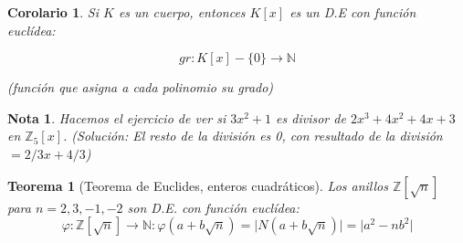 \documentclass[11pt, a4paper, titlepage]{article}
\providecommand{\ent}{\mathbb{Z}}
\providecommand{\nat}{\mathbb{N}}
\providecommand{\abs}[1]{\lvert#1\rvert}
\theoremstyle{theorem-style}
\newtheorem*{nth}{Teorema}
\newtheorem{ncor}{Corolario}
\theoremstyle{definition-style}
\theoremstyle{remark-style}
\newtheorem*{nota}{Nota}
\theoremstyle{example-style}
\begin{document}
\begin{ncor}
	Si $K$ es un cuerpo, entonces $K[x]$ es un D.E con función euclídea:
	
	\[
	gr: K[x]-\{0\} \to \nat
	\]
	
(función que asigna a cada polinomio su grado)
\end{ncor}

\begin{nota}
	Hacemos el ejercicio de ver si $3x^2 +1$ es divisor de $2x^3 + 4x^2 +4x +3$ en $\ent _5[x]$. (Solución: El resto de la división es 0, con resultado de la división $= 2/3 x + 4/3$)
\end{nota}


\begin{nth}[Teorema de Euclides, enteros cuadráticos]
	Los anillos $\ent[\sqrt{n}]$ para $n=2,3,-1,-2$ son D.E. con función euclídea:
	\[
	\varphi: \ent[\sqrt{n}] \to \nat : \varphi(a+b\sqrt{n}) = \abs{N(a+b\sqrt{n})} = \abs{a^2 - nb^2}
	\]
	
	
\end{nth}
\end{document}
